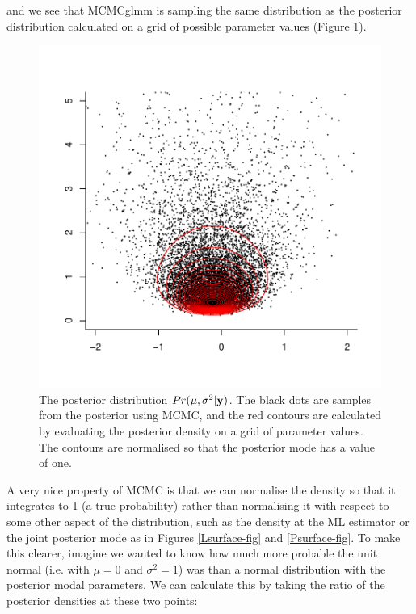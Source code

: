 \documentclass{article}
\begin{document}
and we see that MCMCglmm is sampling the same distribution as the posterior distribution calculated on a grid of possible parameter values (Figure \ref{PsurfaceMCMC-fig}).\\

\iftalk
\else
\fi

\begin{figure}[!h]
\begin{center}
\includegraphics{Lecture1-041}
\end{center}
\caption{The posterior distribution $Pr(\mu, \sigma^{2} | {\bf y})$. The black dots are samples from the posterior using MCMC, and the red contours are calculated by evaluating the posterior density on a grid of parameter values. The contours are normalised so that the posterior mode has a value of one.}
\label{PsurfaceMCMC-fig}
\end{figure}

A very nice property of MCMC is that we can normalise the density so that it integrates to 1 (a true probability) rather than normalising it with respect to some other aspect of the distribution, such as the density at the ML estimator or the joint posterior mode as in Figures \ref{Lsurface-fig} and \ref{Psurface-fig}. To make this clearer, imagine we wanted to know how much more probable the unit normal (i.e. with $\mu=0$ and $\sigma^{2}=1$) was than a normal distribution with the posterior modal parameters. We can calculate this by taking the ratio of the posterior densities at these two points:  \\ 
 
\end{document}
